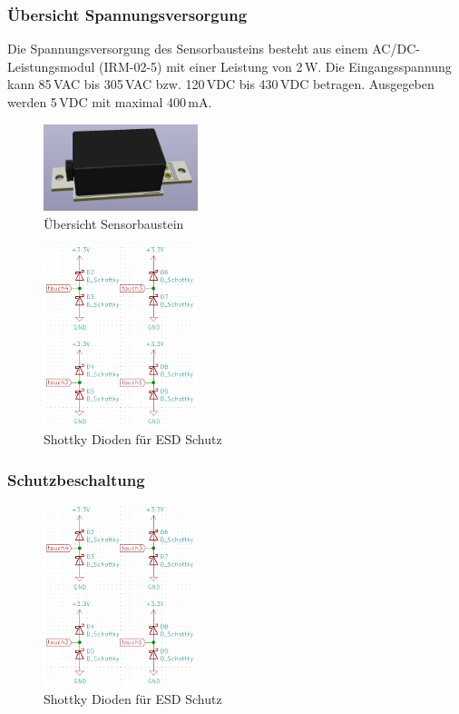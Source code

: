 \subsubsection{Übersicht Spannungsversorgung}
Die Spannungsversorgung des Sensorbausteins besteht aus einem AC/DC-Leistungsmodul (IRM-02-5) mit einer Leistung von 2\,W. Die Eingangsspannung kann 85\,VAC bis 305\,VAC bzw. 120\,VDC bis 430\,VDC betragen. Ausgegeben werden 5\,VDC mit maximal 400\,mA.
\begin{figure}[H]
	\centering
	\includegraphics[width=0.4\textwidth]{graphics/Spannungsversorgung.png}
	\caption{Übersicht Sensorbaustein}
	\label{pic: Spannungsversorgung}
\end{figure} 

\begin{figure}[h!]
	\centering
	\includegraphics[width=0.4\textwidth]{graphics/shematics_sensor_Shottky.png}
	\caption{Shottky Dioden für ESD Schutz}
	\label{pic: Sensor_Shottky}
\end{figure}

\subsubsection{Schutzbeschaltung}

\begin{figure}[h!]
	\centering
	\includegraphics[width=0.4\textwidth]{graphics/shematics_sensor_Shottky.png}
	\caption{Shottky Dioden für ESD Schutz}
	\label{pic: Sensor_Shottky}
\end{figure}


